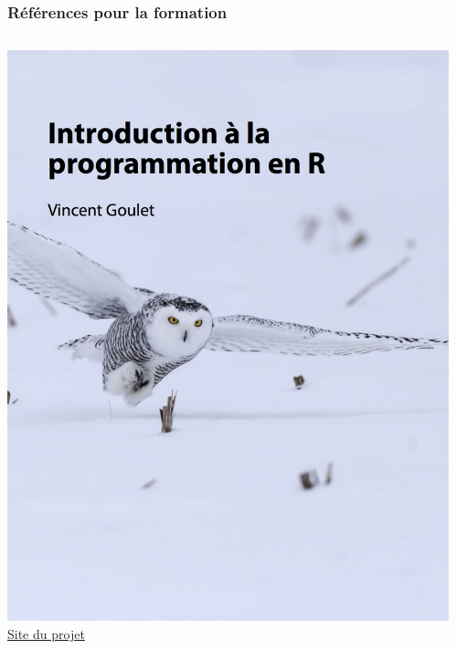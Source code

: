 \begin{frame}
  \frametitle{Références pour la formation}

  \begin{columns}
    \begin{column}{.4\textwidth}
      \includegraphics[width=\linewidth,frame]{introduction-programmation-r} \\
      \href{https://vigou3.github.io/introduction-programmation-r}{%
        Site du projet}
    \end{column}
    \begin{column}{.4\textwidth}

\end{column}
\end{columns}
\end{frame}
